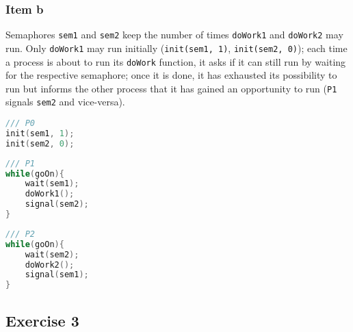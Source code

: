 {\subsubsection{Item b}
Semaphores \texttt{sem1} and \texttt{sem2} keep the number of times \texttt{doWork1} and \texttt{doWork2} may run. Only \texttt{doWork1} may run initially (\texttt{init(sem1, 1)}, \texttt{init(sem2, 0)}); each time a process is about to run its \texttt{doWork} function, it asks if it can still run by waiting for the respective semaphore; once it is done, it has exhausted its possibility to run but informs the other process that it has gained an opportunity to run (\texttt{P1} signals \texttt{sem2} and vice-versa).
\begin{lstlisting}[language=C]
/// P0
init(sem1, 1);
init(sem2, 0);
\end{lstlisting}
\begin{center}
\begin{minipage}{0.47\textwidth}\begin{lstlisting}[language=C]
/// P1
while(goOn){
    wait(sem1);
    doWork1();
    signal(sem2);
}
\end{lstlisting} \end{minipage} \hspace{2em}
\begin{minipage}{0.47\textwidth} \begin{lstlisting}[language=C]
/// P2
while(goOn){
    wait(sem2);
    doWork2();
    signal(sem1);
}
\end{lstlisting} \end{minipage}
\end{center}

\subsection{Exercise 3}

}
